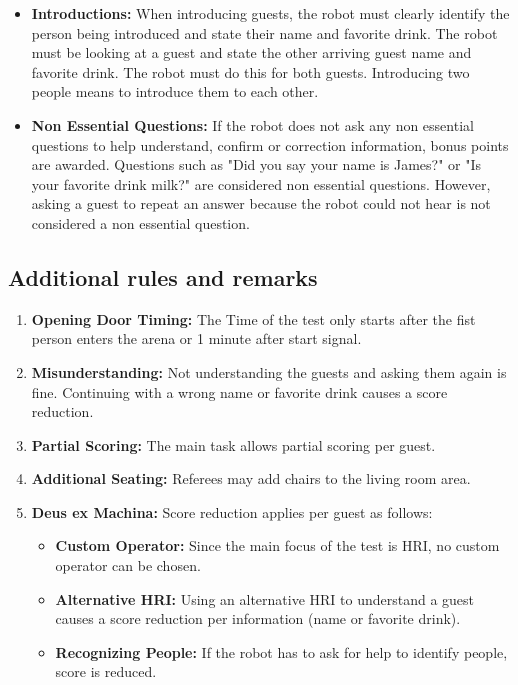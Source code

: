 \begin{itemize}
	\item \textbf{Introductions:} When introducing guests, the robot must clearly identify the person being introduced and state their name and favorite drink. The robot must be looking at a guest and state the other arriving guest name and favorite drink. The robot must do this for both guests.
	Introducing two people means to introduce them to each other.
	
	\item \textbf{Non Essential Questions:} If the robot does not ask any non essential questions to help understand, confirm or correction information, bonus points are awarded. 
		Questions such as "Did you say your name is James?" or "Is your favorite drink milk?" are considered non essential questions. 
		However, asking a guest to repeat an answer because the robot could not hear is not considered a non essential question.

\end{itemize}

\subsection*{Additional rules and remarks}
\begin{enumerate}[nosep]
	\item \textbf{Opening Door Timing:} The Time of the test only starts after the fist person enters the arena or 1 minute after start signal.

	\item \textbf{Misunderstanding:} Not understanding the guests and asking them again is fine. Continuing with a wrong name or favorite drink causes a score reduction.
		
	\item \textbf{Partial Scoring:} The main task allows partial scoring per guest.

	\item \textbf{Additional Seating:} Referees may add chairs to the living room area.
	
	\item \textbf{Deus ex Machina:} Score reduction applies per guest as follows:
	\begin{itemize}[nosep]
		\item \textbf{Custom Operator:} Since the main focus of the test is HRI, no custom operator can be chosen.
		\item \textbf{Alternative HRI:} Using an alternative HRI to understand a guest causes a score reduction per information (name or favorite drink).
		\item \textbf{Recognizing People:} If the robot has to ask for help to identify people, score is reduced. 
	\end{itemize}
\end{enumerate}



